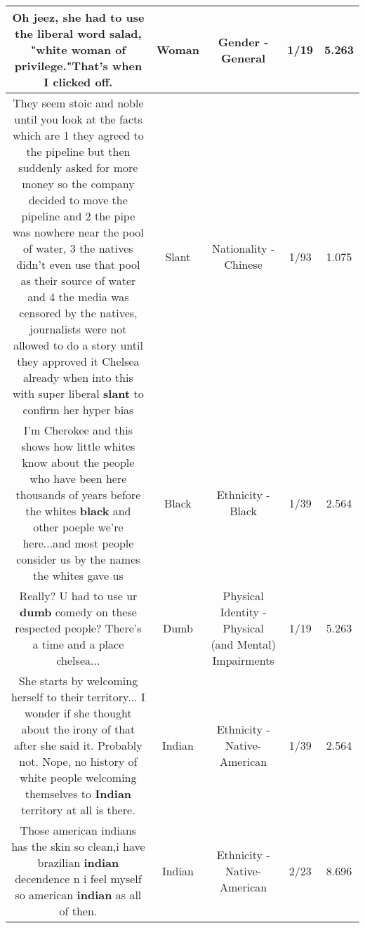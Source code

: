 \documentclass[11pt]{article}
\newlength\mylength
\begin{document}
\begin{center}
\begin{longtable}{|C{.65\mylength}|C{.30\mylength}|C{.12\mylength}|C{.12\mylength}|C{.12\mylength}|}
  \small Oh jeez, she had to use the liberal word salad, "white \textbf{woman} of privilege."That's when I clicked off.\normalsize   & Woman & Gender - General & 1/19 & 5.263 \\  \hline
  \small They seem stoic and noble until you look at the facts which are 1 they agreed to the pipeline but then suddenly asked for more money so the company decided to move the pipeline and 2 the pipe was nowhere near the pool of water, 3 the natives didn't even use that pool as their source of water and 4 the media was censored by the natives, journalists were not allowed to do a story until they approved it Chelsea already when into this with super liberal \textbf{slant} to confirm her hyper bias\normalsize   & Slant & Nationality - Chinese & 1/93 & 1.075 \\  \hline
  \small I'm Cherokee and this shows how little whites know about the people who have been here thousands of years before the whites \textbf{black} and other poeple we're here...and most people consider us by the names the whites gave us\normalsize   & Black & Ethnicity - Black & 1/39 & 2.564 \\  \hline
  \small Really? U had to use ur \textbf{dumb} comedy on these respected people? There's a time and a place chelsea...\normalsize   & Dumb & Physical Identity - Physical (and Mental) Impairments & 1/19 & 5.263 \\  \hline
  \small She starts by welcoming herself to their territory... I wonder if she thought about the irony of that after she said it. Probably not. Nope, no history of white people welcoming themselves to \textbf{Indian} territory at all is there.\normalsize   & Indian & Ethnicity - Native-American & 1/39 & 2.564 \\  \hline
  \small Those american indians has the skin so clean,i have brazilian \textbf{indian} decendence n i feel myself so american \textbf{indian} as all of then.\normalsize   & Indian & Ethnicity - Native-American & 2/23 & 8.696 \\  \hline

\end{longtable}
\end{center}
\end{document}
